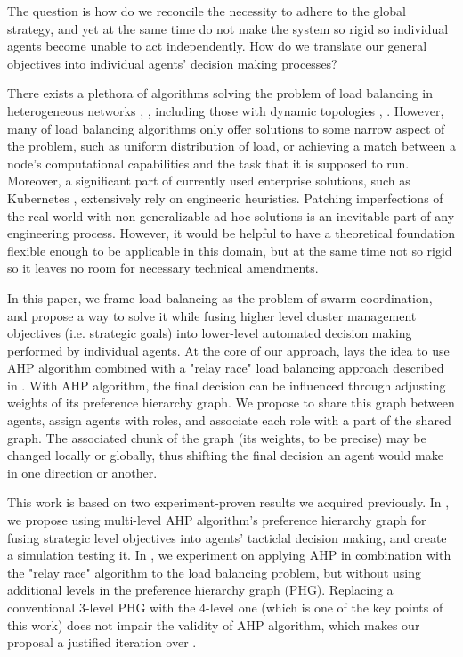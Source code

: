 The question is how do we reconcile the necessity to adhere to the global strategy, and yet at the same time do not make
the system so rigid so individual agents become unable to act independently.
How do we translate our general objectives into individual agents' decision making processes?

There exists a plethora of algorithms solving the problem of load balancing in heterogeneous networks \cite{gamal-2019}, \cite{adhikari-2018}, including those with dynamic topologies \cite{sahoo-2020}, \cite{zhang-2018}.
However, many of load balancing algorithms only offer solutions to some narrow aspect of the problem, such as uniform distribution of load, or achieving a match between a node's computational capabilities and the task that it is supposed to run.
Moreover, a significant part of currently used enterprise solutions, such as Kubernetes \cite{kubernet17}, extensively rely on engineeric heuristics.
Patching imperfections of the real world with non-generalizable ad-hoc solutions is an inevitable part of any engineering process.
However, it would be helpful to have a theoretical foundation flexible enough to be applicable in this domain, but at the same time not so rigid so it leaves no room for necessary technical amendments.

In this paper, we frame load balancing as the problem of swarm coordination, and propose a way to solve it while fusing higher level cluster management objectives (i.e. strategic goals) into lower-level automated decision making performed by individual agents.
At the core of our approach, lays the idea to use AHP \cite{saaty-2008} algorithm combined with a "relay race" load balancing approach described in \cite{gorodetskii-2012}.
With AHP algorithm, the final decision can be influenced through adjusting weights of its preference hierarchy graph.
We propose to share this graph between agents, assign agents with roles, and associate each role with a part of the shared graph.
The associated chunk of the graph (its weights, to be precise) may be changed locally or globally, thus shifting the final decision an agent would make in one direction or another.

This work is based on two experiment-proven results we acquired previously.
In \cite{murashov-2021}, we propose using multi-level AHP algorithm's preference hierarchy graph for fusing strategic level objectives into agents' tacticlal decision making, and create a simulation testing it.
In \cite{murashov-2022}, we experiment on applying AHP in combination with the "relay race" algorithm to the load balancing problem, but without using additional levels in the preference hierarchy graph (PHG).
Replacing a conventional 3-level PHG with the 4-level one (which is one of the key points of this work) does not impair the validity of AHP algorithm, which makes our proposal a justified iteration over \cite{murashov-2022}.

